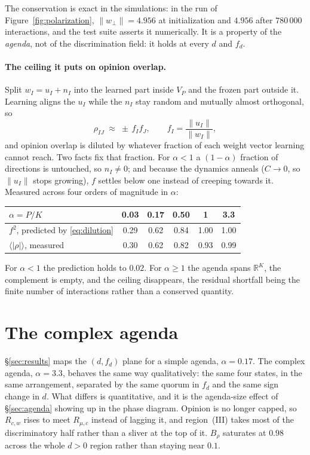 \documentclass{article}
\newcommand{\Rmuc}{R_{\mu,c}}
\newcommand{\Rcw}{R_{c,w}}
\newcommand{\Brho}{B_{\rho}}
\newcommand{\fd}{f_{d}}
\begin{document}
The conservation is exact in the simulations: in the run of
Figure~\ref{fig:polarization}, $\|w_{\perp}\|=4.956$ at initialization and $4.956$
after $780\,000$ interactions, and the test suite asserts it numerically. It is a
property of the \emph{agenda}, not of the discrimination field: it holds at every
$d$ and $\fd$.

\paragraph{The ceiling it puts on opinion overlap.} Split $w_I = u_I + n_I$ into the
learned part inside $V_P$ and the frozen part outside it. Learning aligns the $u_I$
while the $n_I$ stay random and mutually almost orthogonal, so
%
\begin{equation}
  \rho_{IJ} \;\approx\; \pm\, f_I f_J,
  \qquad f_I = \frac{\|u_I\|}{\|w_I\|},
  \label{eq:dilution}
\end{equation}
%
and opinion overlap is diluted by whatever fraction of each weight vector learning
cannot reach. Two facts fix that fraction. For $\alpha<1$ a $(1-\alpha)$ fraction of
directions is untouched, so $n_I\neq0$; and because the dynamics anneals
($C\to0$, so $\|u_I\|$ stops growing), $f$ settles below one instead of creeping towards it.
Measured across four orders of magnitude in $\alpha$:

\begin{table}[h]
\centering\small
\begin{tabular}{lccccc}
\toprule
$\alpha = P/K$ & 0.03 & 0.17 & 0.50 & 1 & 3.3 \\
\midrule
$f^{2}$, predicted by \eqref{eq:dilution} & 0.29 & 0.62 & 0.84 & 1.00 & 1.00 \\
$\langle|\rho|\rangle$, measured            & 0.30 & 0.62 & 0.82 & 0.93 & 0.99 \\
\bottomrule
\end{tabular}
\end{table}

For $\alpha<1$ the prediction holds to $0.02$. For $\alpha\ge1$ the agenda spans
$\mathbb{R}^{K}$, the complement is empty, and the ceiling disappears, the residual
shortfall being the finite number of interactions rather than a conserved quantity.

\section{The complex agenda}
\label{app:large-agenda}

\S\ref{sec:results} maps the $(d,\fd)$ plane for a simple agenda, $\alpha=0.17$. The
complex agenda, $\alpha=3.3$, behaves the same way qualitatively: the same four
states, in the same arrangement, separated by the same quorum in $\fd$ and the same
sign change in $d$. What differs is quantitative, and it is the agenda-size effect of
\S\ref{sec:agenda} showing up in the phase diagram. Opinion is no longer capped, so
$\Rcw$ rises to meet $\Rmuc$ instead of lagging it, and region~(III) takes most of the
discriminatory half rather than a sliver at the top of it. $\Brho$ saturates at $0.98$
across the whole $d>0$ region rather than staying near $0.1$.
\end{document}
